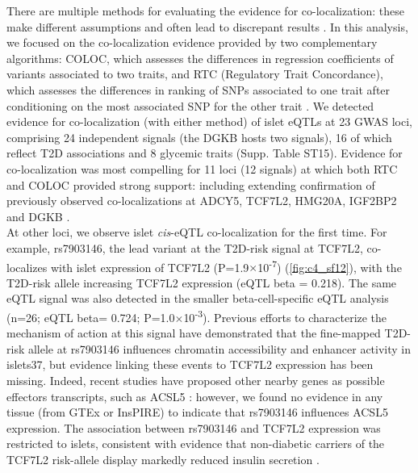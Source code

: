 There are multiple methods for evaluating the evidence for co-localization: these make different assumptions and often lead to discrepant results \cite{kanduriColocalizationAnalysesGenomic}. In this analysis, we focused on the co-localization evidence provided by two complementary algorithms: COLOC, which assesses the differences in regression coefficients of variants associated to two traits, and RTC (Regulatory Trait Concordance), which assesses the differences in ranking of SNPs associated to one trait after conditioning on the most associated SNP for the other trait \cite{giambartolomeiBayesianTestColocalisation2014, ongenEstimatingCausalTissues2017}. We detected evidence for co-localization (with either method) of islet eQTLs at 23 GWAS loci, comprising 24 independent signals (the DGKB hosts two signals), 16 of which reflect T2D associations and 8 glycemic traits (Supp. Table ST15). Evidence for co-localization was most compelling for 11 loci (12 signals) at which both RTC and COLOC provided strong support: including extending confirmation of previously observed co-localizations at ADCY5, TCF7L2, HMG20A, IGF2BP2 and DGKB \cite{thurnerIntegrationHumanPancreatic2018, carratDecreasedSTARD10Expression2017}. \\
    
At other loci, we observe islet \textit{cis}-eQTL co-localization for the first time. For example, rs7903146, the lead variant at the T2D-risk signal at TCF7L2, co-localizes with islet expression of TCF7L2 (P=1.9$\times$10\textsuperscript{-7}) (\ref{fig:c4_sf12}), with the T2D-risk allele increasing TCF7L2 expression (eQTL beta = 0.218). The same eQTL signal was also detected in the smaller beta-cell-specific eQTL analysis (n=26; eQTL beta= 0.724; P=1.0$\times$10\textsuperscript{-3}). Previous efforts to characterize the mechanism of action at this signal have demonstrated that the fine-mapped T2D-risk allele at rs7903146 influences chromatin accessibility and enhancer activity in islets37, but evidence linking these events to TCF7L2 expression has been missing. Indeed, recent studies have proposed other nearby genes as possible effectors transcripts, such as ACSL5 \cite{grantVariantTranscriptionFactor2006}: however, we found no evidence in any tissue (from GTEx or InsPIRE) to indicate that rs7903146 influences ACSL5 expression. The association between rs7903146 and TCF7L2 expression was restricted to islets, consistent with evidence that non-diabetic carriers of the TCF7L2 risk-allele display markedly reduced insulin secretion \cite{zhouTCF7L2MasterRegulator2014}. \\

